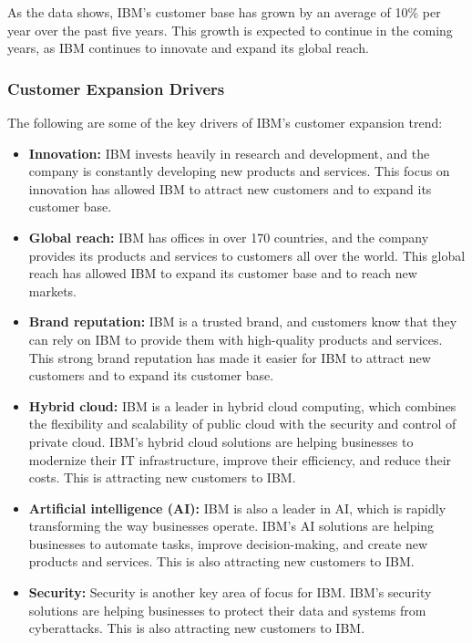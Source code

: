 As the data shows, IBM's customer base has grown by an average of 10\% per year over the past five years. This growth is expected to continue in the coming years, as IBM continues to innovate and expand its global reach.

\subsubsection{Customer Expansion Drivers}

The following are some of the key drivers of IBM's customer expansion trend:

\begin{itemize}
\item \textbf{Innovation:} IBM invests heavily in research and development, and the company is constantly developing new products and services. This focus on innovation has allowed IBM to attract new customers and to expand its customer base.
\item \textbf{Global reach:} IBM has offices in over 170 countries, and the company provides its products and services to customers all over the world. This global reach has allowed IBM to expand its customer base and to reach new markets.
\item \textbf{Brand reputation:} IBM is a trusted brand, and customers know that they can rely on IBM to provide them with high-quality products and services. This strong brand reputation has made it easier for IBM to attract new customers and to expand its customer base.
\item \textbf{Hybrid cloud:} IBM is a leader in hybrid cloud computing, which combines the flexibility and scalability of public cloud with the security and control of private cloud. IBM's hybrid cloud solutions are helping businesses to modernize their IT infrastructure, improve their efficiency, and reduce their costs. This is attracting new customers to IBM.
\item \textbf{Artificial intelligence (AI):} IBM is also a leader in AI, which is rapidly transforming the way businesses operate. IBM's AI solutions are helping businesses to automate tasks, improve decision-making, and create new products and services. This is also attracting new customers to IBM.
\item \textbf{Security:} Security is another key area of focus for IBM. IBM's security solutions are helping businesses to protect their data and systems from cyberattacks. This is also attracting new customers to IBM.
\end{itemize}

